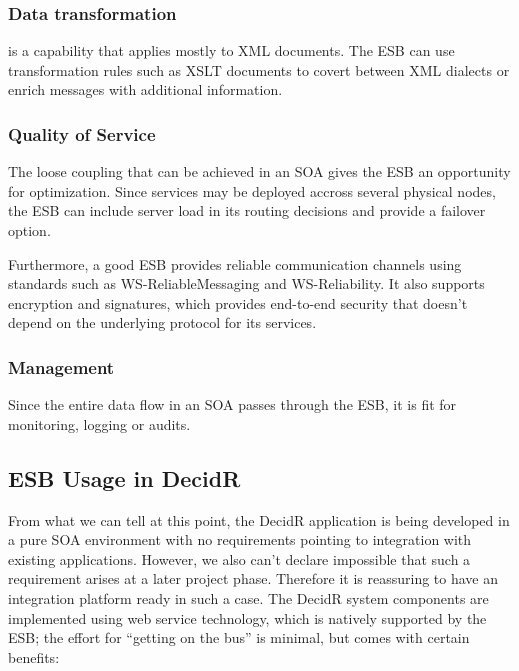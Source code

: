 \subsubsection{Data transformation}
\label{subsec:data-transformation}

is a capability that applies mostly to XML documents. The
ESB can use transformation rules such as XSLT documents to covert between XML
dialects or enrich messages with additional information.


\subsubsection{Quality of Service}
\label{subsec:quality-of-service}

The loose coupling that can be achieved in an SOA gives the ESB an opportunity
for optimization. Since services may be deployed accross several physical nodes,
the ESB can include server load in its routing decisions and provide a failover
option.

Furthermore, a good ESB provides reliable communication channels using standards
such as WS-ReliableMessaging and WS-Reliability. It also supports encryption and
signatures, which provides end-to-end security that doesn't depend on the
underlying protocol for its services.

\subsubsection{Management}
\label{subsec:management}

Since the entire data flow in an SOA passes through the ESB, it is
fit for monitoring, logging or audits.

\subsection{ESB Usage in DecidR}
\label{subsec:esb-usage-in-decidr}

From what we can tell at this point, the DecidR application is being developed
in a pure SOA environment with no requirements pointing to integration with
existing applications. However, we also can't declare impossible that such a
requirement arises at a later project phase. Therefore it is reassuring
to have an integration platform ready in such a case.
The DecidR system components are implemented using web service technology,
which is natively supported by the ESB; the effort for ``getting on the
bus'' is minimal, but comes with certain benefits:

